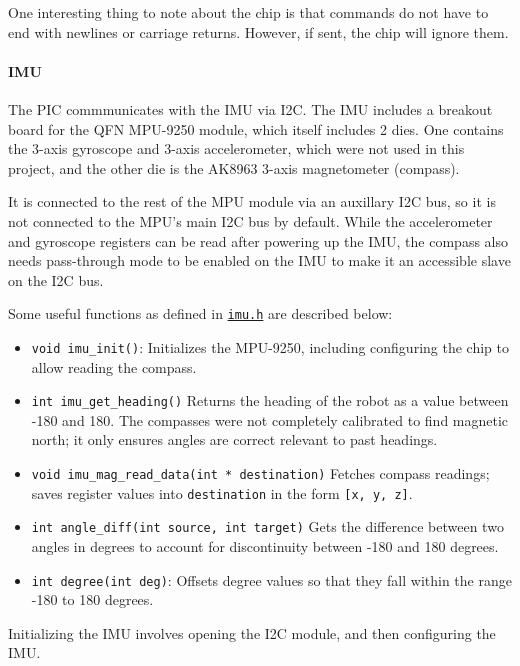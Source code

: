 \documentclass[]{article}
\providecommand{\tightlist}{%
  \setlength{\itemsep}{0pt}\setlength{\parskip}{0pt}}
\let\oldparagraph\paragraph
\renewcommand{\paragraph}[1]{\oldparagraph{#1}\mbox{}}
\begin{document}
One interesting thing to note about the chip is that commands do not
have to end with newlines or carriage returns. However, if sent, the
chip will ignore them.

\hypertarget{imu}{%
\paragraph{IMU}\label{imu}}

The PIC commmunicates with the IMU via I2C. The IMU includes a breakout
board for the QFN MPU-9250 \cite{mpu9250datasheet} \cite{mpu9250regmap} module, which itself includes 2 dies. One
contains the 3-axis gyroscope and 3-axis accelerometer, which were not
used in this project, and the other die is the AK8963 3-axis
magnetometer (compass).

It is connected to the rest of the MPU module via an auxillary I2C bus,
so it is not connected to the MPU's main I2C bus by default. While the
accelerometer and gyroscope registers can be read after powering up the
IMU, the compass also needs pass-through mode to be enabled on the IMU
to make it an accessible slave on the I2C bus.

Some useful functions as defined in
\href{generated/imu.h.html}{\texttt{imu.h}} are described below:

\begin{itemize}
\tightlist
\item
  \texttt{void\ imu\_init()}: Initializes the MPU-9250, including
  configuring the chip to allow reading the compass.
\item
  \texttt{int\ imu\_get\_heading()} Returns the heading of the robot as
  a value between -180 and 180. The compasses were not completely
  calibrated to find magnetic north; it only ensures angles are correct
  relevant to past headings.
\item
  \texttt{void\ imu\_mag\_read\_data(int\ *\ destination)} Fetches
  compass readings; saves register values into \texttt{destination} in
  the form \texttt{{[}x,\ y,\ z{]}}.
\item
  \texttt{int\ angle\_diff(int\ source,\ int\ target)} Gets the
  difference between two angles in degrees to account for discontinuity
  between -180 and 180 degrees.
\item
  \texttt{int\ degree(int\ deg)}: Offsets degree values so that they
  fall within the range -180 to 180 degrees.
\end{itemize}

Initializing the IMU involves opening the I2C module, and then
configuring the IMU.
\end{document}
